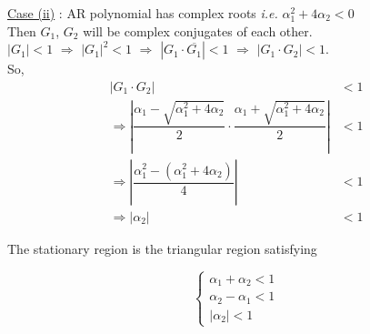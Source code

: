 \documentclass[11pt, a4paper]{article}
\numberwithin{equation}{section}
\theoremstyle{definition}
\begin{document}
\vspace{0.5cm}

\underline{Case (ii)} : AR polynomial has complex roots \textit{i.e.} $\alpha_1^2 + 4\alpha_2 < 0$ \\[0.75em]

Then $G_1$, $G_2$ will be complex conjugates of each other. \\[0.5em]

$|G_1| < 1$ $\Rightarrow$ $|G_1|^2 < 1$ $\Rightarrow$ $|G_1 \cdot \overline{G_1}| < 1$ $\Rightarrow$ $|G_1 \cdot G_2| < 1$. \\[0.5em]

So, 
\begin{align*}
|G_1 \cdot G_2| &< 1 \\[0.5em]
\Rightarrow \left| \dfrac{\alpha_1 - \sqrt{\alpha_1^2 + 4\alpha_2}}{2} \cdot \dfrac{\alpha_1 + \sqrt{\alpha_1^2 + 4\alpha_2}}{2} \right| &< 1 \\[0.5em]
\Rightarrow \left| \dfrac{\alpha_1^2 - \left(\alpha_1^2 + 4\alpha_2\right)}{4} \right| &< 1 \\[0.5em]
\Rightarrow |\alpha_2| &< 1
\end{align*}

The stationary region is the triangular region satisfying

\begin{equation}\label{ar2stationaryconditions}
\begin{cases}
\alpha_1 + \alpha_2 < 1 \\[0.5em]
\alpha_2 - \alpha_1 < 1 \\[0.5em]
|\alpha_2| < 1
\end{cases}
\end{equation}
\end{document}
